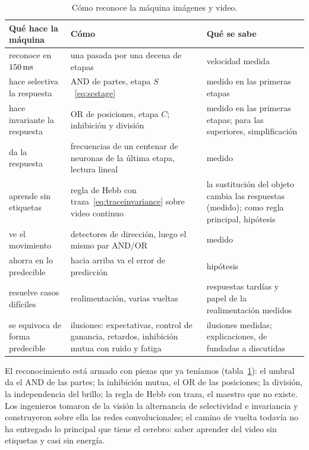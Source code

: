 \begin{table}[t]
\centering
\footnotesize
\setlength{\tabcolsep}{4pt}
\renewcommand{\arraystretch}{1.15}
\begin{tabular}{>{\raggedright}p{3.0cm}>{\raggedright}p{4.6cm}>{\raggedright\arraybackslash}p{5.2cm}}
\toprule
Qué hace la máquina & Cómo & Qué se sabe \\
\midrule
reconoce en $150\,\text{ms}$ & una pasada por una decena de etapas & velocidad medida \\
hace selectiva la respuesta & AND de partes, etapa $S$~\eqref{eq:scstage} & medido en las primeras etapas \\
hace invariante la respuesta & OR de posiciones, etapa $C$; inhibición y división & medido en las primeras etapas; para las superiores, simplificación \\
da la respuesta & frecuencias de un centenar de neuronas de la última etapa, lectura lineal & medido \\
aprende sin etiquetas & regla de Hebb con traza~\eqref{eq:traceinvariance} sobre video continuo & la sustitución del objeto cambia las respuestas (medido); como regla principal, hipótesis \\
ve el movimiento & detectores de dirección, luego el mismo par AND/OR & medido \\
ahorra en lo predecible & hacia arriba va el error de predicción & hipótesis \\
resuelve casos difíciles & realimentación, varias vueltas & respuestas tardías y papel de la realimentación medidos \\
se equivoca de forma predecible & ilusiones: expectativas, control de ganancia, retardos, inhibición mutua con ruido y fatiga & ilusiones medidas; explicaciones, de fundadas a discutidas \\
\bottomrule
\end{tabular}
\caption{Cómo reconoce la máquina imágenes y video.}
\label{tab:recognition}
\end{table}

El reconocimiento está armado con piezas que ya teníamos (tabla~\ref{tab:recognition}): el umbral da el AND de las partes; la inhibición mutua, el OR de las posiciones; la división, la independencia del brillo; la regla de Hebb con traza, el maestro que no existe. Los ingenieros tomaron de la visión la alternancia de selectividad e invariancia y construyeron sobre ella las redes convolucionales; el camino de vuelta todavía no ha entregado lo principal que tiene el cerebro: saber aprender del video sin etiquetas y casi sin energía.

